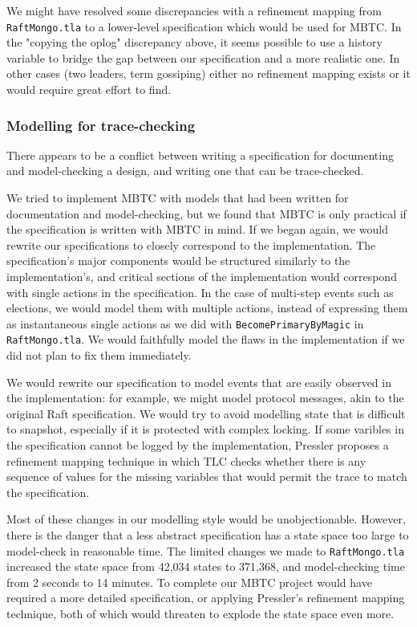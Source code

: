 \documentclass{vldb}
\begin{document}
We might have resolved some discrepancies with a refinement mapping \cite{Abadi88ExistenceOfRefinementMapping} from \texttt{RaftMongo.tla} to a lower-level specification which would be used for MBTC. In the "copying the oplog" discrepancy above, it seems possible to use a history variable \cite{Lamport2018AuxiliaryVariables} to bridge the gap between our specification and a more realistic one. In other cases (two leaders, term gossiping) either no refinement mapping exists or it would require great effort to find.

\subsubsection{Modelling for trace-checking}
\label{subsubsec:modelling_for_trace_checking}

There appears to be a conflict between writing a specification for documenting and model-checking a design, and writing one that can be trace-checked.

We tried to implement MBTC with models that had been written for documentation and model-checking, but we found that MBTC is only practical if the specification is written with MBTC in mind.
If we began again, we would rewrite our specifications to closely correspond to the implementation.
The specification's major components would be structured similarly to the implementation's, and critical sections of the implementation would correspond with single actions in the specification.
In the case of multi-step events such as elections, we would model them with multiple actions, instead of expressing them as instantaneous single actions as we did with \texttt{BecomePrimaryByMagic} in \texttt{RaftMongo.tla}.
We would faithfully model the flaws in the implementation if we did not plan to fix them immediately.

We would rewrite our specification to model events that are easily observed in the implementation: for example, we might model protocol messages, akin to the original Raft specification.
We would try to avoid modelling state that is difficult to snapshot, especially if it is protected with complex locking.
If some varibles in the specification cannot be logged by the implementation, Pressler proposes a refinement mapping technique \cite{Pressler18VerifyingSoftwareTracesTLAPlus} in which TLC checks whether there is any sequence of values for the missing variables that would permit the trace to match the specification.

Most of these changes in our modelling style would be unobjectionable.
However, there is the danger that a less abstract specification has a state space too large to model-check in reasonable time.
The limited changes we made to \texttt{RaftMongo.tla} increased the state space from 42,034 states to 371,368, and model-checking time from 2 seconds to 14 minutes.
To complete our MBTC project would have required a more detailed specification, or applying Pressler's refinement mapping technique, both of which would threaten to explode the state space even more.
\end{document}
